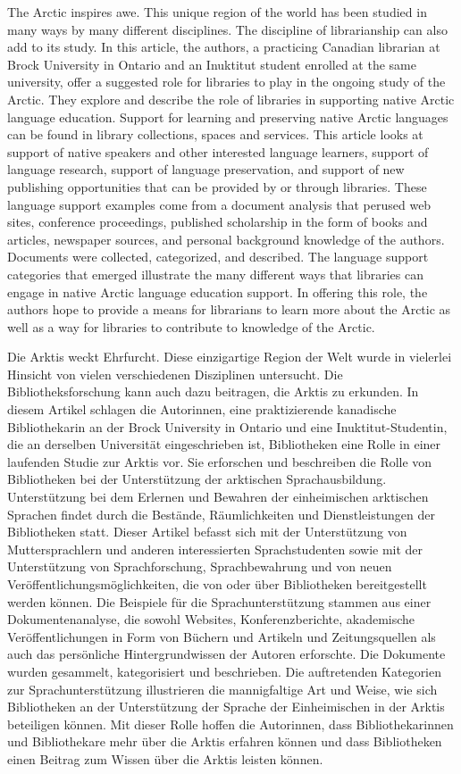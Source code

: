 The Arctic inspires awe. This unique region of the world has been
studied in many ways by many different disciplines. The discipline of
librarianship can also add to its study. In this article, the authors, a
practicing Canadian librarian at Brock University in Ontario and an
Inuktitut student enrolled at the same university, offer a suggested
role for libraries to play in the ongoing study of the Arctic. They
explore and describe the role of libraries in supporting native Arctic
language education. Support for learning and preserving native Arctic
languages can be found in library collections, spaces and services. This
article looks at support of native speakers and other interested
language learners, support of language research, support of language
preservation, and support of new publishing opportunities that can be
provided by or through libraries. These language support examples come
from a document analysis that perused web sites, conference proceedings,
published scholarship in the form of books and articles, newspaper
sources, and personal background knowledge of the authors. Documents
were collected, categorized, and described. The language support
categories that emerged illustrate the many different ways that
libraries can engage in native Arctic language education support. In
offering this role, the authors hope to provide a means for librarians
to learn more about the Arctic as well as a way for libraries to
contribute to knowledge of the Arctic.

Die Arktis weckt Ehrfurcht. Diese einzigartige Region der Welt wurde in
vielerlei Hinsicht von vielen verschiedenen Disziplinen untersucht. Die
Bibliotheksforschung kann auch dazu beitragen, die Arktis zu erkunden.
In diesem Artikel schlagen die Autorinnen, eine praktizierende
kanadische Bibliothekarin an der Brock University in Ontario und eine
Inuktitut-Studentin, die an derselben Universität eingeschrieben ist,
Bibliotheken eine Rolle in einer laufenden Studie zur Arktis vor. Sie
erforschen und beschreiben die Rolle von Bibliotheken bei der
Unterstützung der arktischen Sprachausbildung. Unterstützung bei dem
Erlernen und Bewahren der einheimischen arktischen Sprachen findet durch
die Bestände, Räumlichkeiten und Dienstleistungen der Bibliotheken
statt. Dieser Artikel befasst sich mit der Unterstützung von
Muttersprachlern und anderen interessierten Sprachstudenten sowie mit
der Unterstützung von Sprachforschung, Sprachbewahrung und von neuen
Veröffentlichungsmöglichkeiten, die von oder über Bibliotheken
bereitgestellt werden können. Die Beispiele für die Sprachunterstützung
stammen aus einer Dokumentenanalyse, die sowohl Websites,
Konferenzberichte, akademische Veröffentlichungen in Form von Büchern
und Artikeln und Zeitungsquellen als auch das persönliche
Hintergrundwissen der Autoren erforschte. Die Dokumente wurden
gesammelt, kategorisiert und beschrieben. Die auftretenden Kategorien
zur Sprachunterstützung illustrieren die mannigfaltige Art und Weise,
wie sich Bibliotheken an der Unterstützung der Sprache der Einheimischen
in der Arktis beteiligen können. Mit dieser Rolle hoffen die Autorinnen,
dass Bibliothekarinnen und Bibliothekare mehr über die Arktis erfahren
können und dass Bibliotheken einen Beitrag zum Wissen über die Arktis
leisten können.
